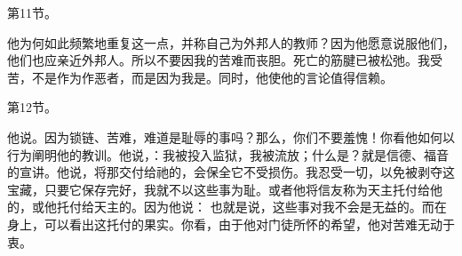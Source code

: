 第11节。 \par

他为何如此频繁地重复这一点，并称自己为外邦人的教师？因为他愿意说服他们，他们也应亲近外邦人。所以不要因我的苦难而丧胆。死亡的筋腱已被松弛。我受苦，不是作为作恶者，而是因为我是。同时，他使他的言论值得信赖。\par

第12节。 \par

他说。因为锁链、苦难，难道是耻辱的事吗？那么，你们不要羞愧！你看他如何以行为阐明他的教训。他说，：我被投入监狱，我被流放；什么是？就是信德、福音的宣讲。他说，将那交付给祂的，会保全它不受损伤。我忍受一切，以免被剥夺这宝藏，只要它保存完好，我就不以这些事为耻。或者他将信友称为天主托付给他的，或他托付给天主的。因为他说：  也就是说，这些事对我不会是无益的。而在身上，可以看出这托付的果实。你看，由于他对门徒所怀的希望，他对苦难无动于衷。\par

